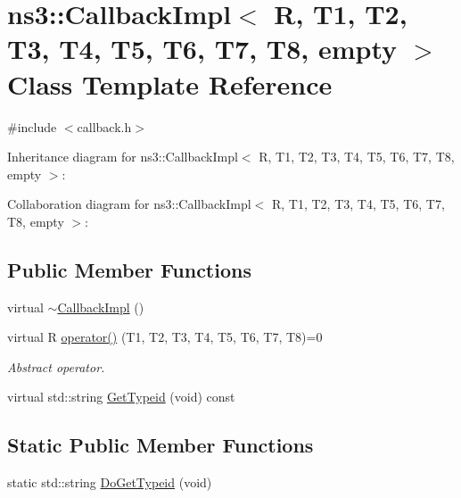 \hypertarget{classns3_1_1CallbackImpl_3_01R_00_01T1_00_01T2_00_01T3_00_01T4_00_01T5_00_01T6_00_01T7_00_01T8_00_01empty_01_4}{}\section{ns3\+:\+:Callback\+Impl$<$ R, T1, T2, T3, T4, T5, T6, T7, T8, empty $>$ Class Template Reference}
\label{classns3_1_1CallbackImpl_3_01R_00_01T1_00_01T2_00_01T3_00_01T4_00_01T5_00_01T6_00_01T7_00_01T8_00_01empty_01_4}


{\ttfamily \#include $<$callback.\+h$>$}



Inheritance diagram for ns3\+:\+:Callback\+Impl$<$ R, T1, T2, T3, T4, T5, T6, T7, T8, empty $>$\+:


Collaboration diagram for ns3\+:\+:Callback\+Impl$<$ R, T1, T2, T3, T4, T5, T6, T7, T8, empty $>$\+:
\subsection*{Public Member Functions}
\begin{DoxyCompactItemize}
\item 
virtual \hyperlink{classns3_1_1CallbackImpl_3_01R_00_01T1_00_01T2_00_01T3_00_01T4_00_01T5_00_01T6_00_01T7_00_01T8_00_01empty_01_4_a24079f9023bb8ab3265f23a63decb59c}{$\sim$\+Callback\+Impl} ()
\item 
virtual R \hyperlink{classns3_1_1CallbackImpl_3_01R_00_01T1_00_01T2_00_01T3_00_01T4_00_01T5_00_01T6_00_01T7_00_01T8_00_01empty_01_4_aa70d806103504c4a1f7597d1b4d23d42}{operator()} (T1, T2, T3, T4, T5, T6, T7, T8)=0
\begin{DoxyCompactList}\small\item\em Abstract operator. \end{DoxyCompactList}\item 
virtual std\+::string \hyperlink{classns3_1_1CallbackImpl_3_01R_00_01T1_00_01T2_00_01T3_00_01T4_00_01T5_00_01T6_00_01T7_00_01T8_00_01empty_01_4_a899d44b92ed131cbbdc62d7123f951a6}{Get\+Typeid} (void) const 
\end{DoxyCompactItemize}
\subsection*{Static Public Member Functions}
\begin{DoxyCompactItemize}
\item 
static std\+::string \hyperlink{classns3_1_1CallbackImpl_3_01R_00_01T1_00_01T2_00_01T3_00_01T4_00_01T5_00_01T6_00_01T7_00_01T8_00_01empty_01_4_aa859c5ab8a5cba08b4d940d098f324d6}{Do\+Get\+Typeid} (void)
\end{DoxyCompactItemize}
